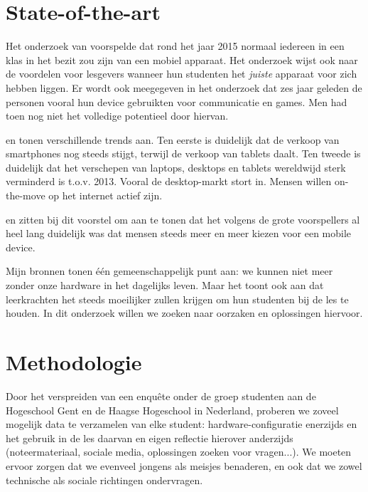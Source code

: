 \documentclass[fleqn,10pt]{voorstel}
\begin{document}

\section{State-of-the-art}
\label{sec:state-of-the-art}

Het onderzoek van \textcite{3} voorspelde dat rond het jaar 2015 normaal iedereen in een klas in het bezit zou zijn van een mobiel apparaat. Het onderzoek wijst ook naar de voordelen voor lesgevers wanneer hun studenten het \emph{juiste} apparaat voor zich hebben liggen. Er wordt ook meegegeven in het onderzoek dat zes jaar geleden de personen vooral hun device gebruikten voor communicatie en games. Men had toen nog niet het volledige potentieel door hiervan. 

\textcite{2} en \textcite{1} tonen verschillende trends aan. Ten eerste is duidelijk dat de verkoop van smartphones nog steeds stijgt, terwijl de verkoop van tablets daalt. Ten tweede is duidelijk dat het verschepen van laptops, desktops en tablets wereldwijd sterk verminderd is t.o.v. 2013. Vooral de desktop-markt stort in. Mensen willen on-the-move op het internet actief zijn.

\textcite{4} en \textcite{5} zitten bij dit voorstel om aan te tonen dat het volgens de grote voorspellers al heel lang duidelijk was dat mensen steeds meer en meer kiezen voor een mobile device. 

Mijn bronnen tonen één gemeenschappelijk punt aan: we kunnen niet meer zonder onze hardware in het dagelijks leven. Maar het toont ook aan dat leerkrachten het steeds moeilijker zullen krijgen om hun studenten bij de les te houden. In dit onderzoek willen we zoeken naar oorzaken en oplossingen hiervoor.

\section{Methodologie}
\label{sec:methodologie}

Door het verspreiden van een enquête onder de groep studenten aan de Hogeschool Gent en de Haagse Hogeschool in Nederland, proberen we zoveel mogelijk data te verzamelen van elke student: hardware-configuratie enerzijds en het gebruik in de les daarvan en eigen reflectie hierover anderzijds (noteermateriaal, sociale media, oplossingen zoeken voor vragen...). We moeten ervoor zorgen dat we evenveel jongens als meisjes benaderen, en ook dat we zowel technische als sociale richtingen ondervragen. 
\end{document}
